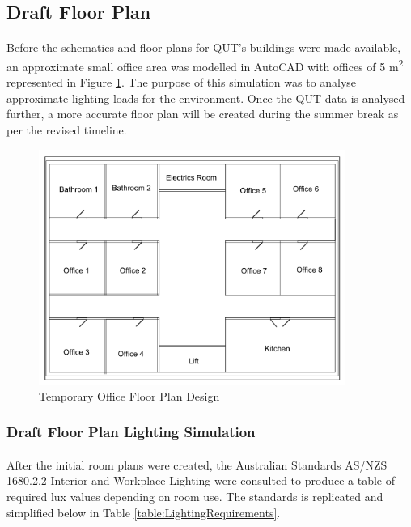 \newpage
\subsection{Draft Floor Plan}

\paragraph{}
Before the schematics and floor plans for QUT's buildings were made available, an approximate small office area was modelled in AutoCAD with offices of 5 \si{m^2} represented in Figure \ref{fig:RoughFloorplan}. The purpose of this simulation was to analyse approximate lighting loads for the environment. Once the QUT data is analysed further, a more accurate floor plan will be created during the summer break as per the revised timeline.    

\begin{figure}[H]
\hfill\includegraphics[width = 100mm]{images/Rough_Floorplan}\hspace*{\fill}
\caption{Temporary Office Floor Plan Design} 
\label{fig:RoughFloorplan}
\end{figure} 

\subsubsection{Draft Floor Plan Lighting Simulation}

\paragraph{}
After the initial room plans were created, the Australian Standards AS/NZS 1680.2.2 Interior and Workplace Lighting were consulted to produce a table of required lux values depending on room use. The standards is replicated and simplified below in Table \ref{table:LightingRequirements}.

